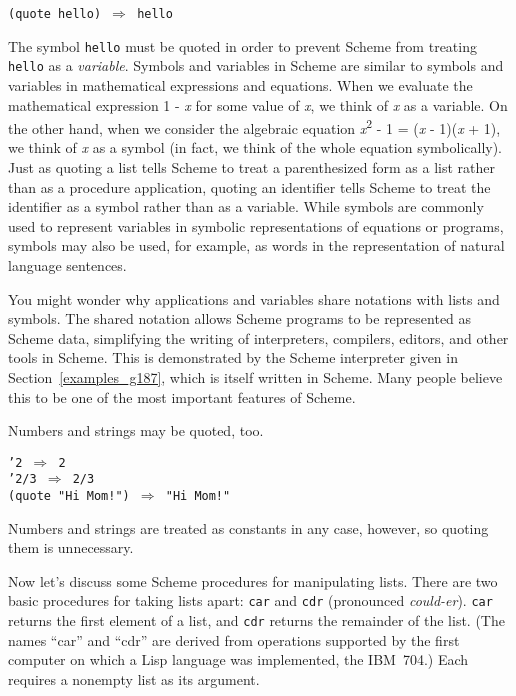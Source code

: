\texttt{(quote hello) \(\Rightarrow\) hello}

The symbol \texttt{hello} must be quoted in order to prevent Scheme from
treating \texttt{hello} as a \textit{variable}.
Symbols and \label{start_s18}variables in Scheme are similar to \label{start_s19}symbols and
variables in mathematical expressions and equations.
When we evaluate the mathematical expression 1 - \textit{x} for some value of
\textit{x}, we think of \textit{x} as a variable.
On the other hand, when we consider the algebraic equation 
\textit{x}\textsuperscript{2} - 1 = (\textit{x} - 1)(\textit{x} + 1), we think of \textit{x} as a symbol (in fact, we
think of the whole equation symbolically).
Just as quoting a list tells Scheme to treat a parenthesized form as
a list rather than as a procedure application,
quoting an identifier tells Scheme to treat the identifier
as a symbol rather than as a variable.
While symbols are commonly used to represent variables in symbolic
representations of equations or programs,
symbols may
also be used, for example, as words in the representation of natural
language sentences.


You might wonder why applications and variables share notations with
lists and symbols.
The shared notation allows Scheme programs to be represented as Scheme
data, simplifying the writing
of interpreters, compilers, editors, and other tools in Scheme.
This is demonstrated by the Scheme interpreter given in
Section \ref{examples_g187},
which is itself written in Scheme.
Many people believe this to be one of the most important features of
Scheme.


Numbers and strings may be quoted, too.


\begin{alltt}
'2 \(\Rightarrow\) 2
'2/3 \(\Rightarrow\) 2/3
(quote "Hi Mom!") \(\Rightarrow\) "Hi Mom!"
\end{alltt}


Numbers and strings are treated as constants in any case, however,
so quoting them is unnecessary.


Now let's discuss some Scheme procedures for manipulating \label{start_s20}lists.
There are two basic procedures for taking lists apart: \label{start_s21}\texttt{car} and
\label{start_s22}\texttt{cdr} (pronounced \textit{could-er}).
\texttt{car} returns the first element of a list, and \texttt{cdr} returns
the remainder of the list.
(The names ``car'' and ``cdr'' are derived from operations
supported by the first computer
on which a Lisp language was implemented, the IBM 704.)
Each requires a nonempty list as its argument.


